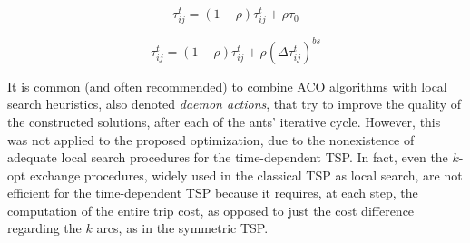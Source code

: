 \begin{equation}
\label{eq:local_update}
    \tau_{ij}^{t} = (1-\rho)\tau_{ij}^{t} + \rho \tau_{0}
\end{equation}

\begin{equation}
\label{eq:pheromone_update}
    \tau_{ij}^{t} = (1-\rho)\tau_{ij}^{t} + \rho (\Delta \tau_{ij}^{t})^{bs}
\end{equation}

It is common (and often recommended) to combine ACO algorithms with local search heuristics, also denoted \textit{daemon actions}, that try to improve the quality of the constructed solutions, after each of the ants' iterative cycle. However, this was not applied to the proposed optimization, due to the nonexistence of adequate local search procedures for the time-dependent TSP. In fact, even the $k$-opt exchange procedures, widely used in the classical TSP as local search, are not efficient for the time-dependent TSP because it requires, at each step, the computation of the entire trip cost, as opposed to just the cost difference regarding the $k$ arcs, as in the symmetric TSP.

